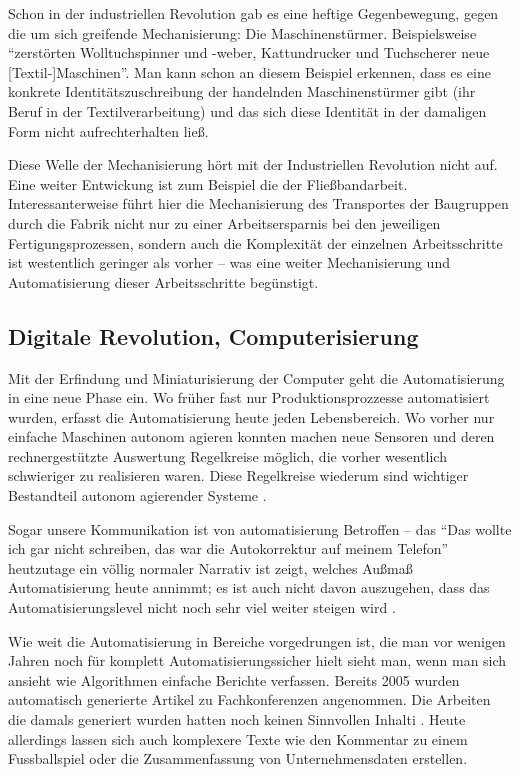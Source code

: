 Schon in der industriellen Revolution gab es eine heftige Gegenbewegung, gegen die um sich greifende Mechanisierung: Die Maschinenstürmer.
Beispielsweise \enquote{zerstörten Wolltuchspinner und -weber, Kattundrucker und Tuchscherer neue [Textil-]Maschinen}\parencite[44]{spehr}.
Man kann schon an diesem Beispiel erkennen, dass es eine konkrete Identitätszuschreibung der handelnden Maschinenstürmer gibt (ihr Beruf in der Textilverarbeitung) und das sich diese Identität in der damaligen Form nicht aufrechterhalten ließ.


Diese Welle der Mechanisierung hört mit der Industriellen Revolution nicht auf.
Eine weiter Entwickung ist zum Beispiel die der Fließbandarbeit.
Interessanterweise führt hier die Mechanisierung des Transportes der Baugruppen durch die Fabrik nicht nur zu einer Arbeitsersparnis bei den jeweiligen Fertigungsprozessen, sondern auch die Komplexität der einzelnen Arbeitsschritte ist westentlich geringer als vorher – was eine weiter Mechanisierung und Automatisierung dieser Arbeitsschritte begünstigt.

\subsection {Digitale Revolution, Computerisierung}
Mit der Erfindung und Miniaturisierung der Computer geht die Automatisierung in eine neue Phase ein. Wo früher fast nur Produktionsprozzesse automatisiert wurden, erfasst die Automatisierung heute jeden Lebensbereich.
Wo vorher nur einfache Maschinen autonom agieren konnten machen neue Sensoren und deren rechnergestützte Auswertung Regelkreise möglich, die vorher wesentlich schwieriger zu realisieren waren.
Diese Regelkreise wiederum sind wichtiger Bestandteil autonom agierender Systeme \parencite{ulrich}.


Sogar unsere Kommunikation ist von automatisierung Betroffen – das \enquote{Das wollte ich gar nicht schreiben, das war die Autokorrektur auf meinem Telefon} heutzutage ein völlig normaler Narrativ ist zeigt, welches Außmaß Automatisierung heute annimmt; es ist auch nicht davon auszugehen, dass das Automatisierungslevel nicht noch sehr viel weiter steigen wird \parencite{arbeitsfrei}.

Wie weit die Automatisierung in Bereiche vorgedrungen ist, die man vor wenigen Jahren noch für komplett Automatisierungssicher hielt sieht man, wenn man sich ansieht wie Algorithmen einfache Berichte verfassen. Bereits 2005 wurden automatisch generierte Artikel zu Fachkonferenzen angenommen. Die Arbeiten die damals generiert wurden hatten noch keinen Sinnvollen Inhalti \parencite{scigen}.
Heute allerdings lassen sich auch komplexere Texte wie den Kommentar zu einem Fussballspiel oder die Zusammenfassung von Unternehmensdaten erstellen\parencite{bou...}.

